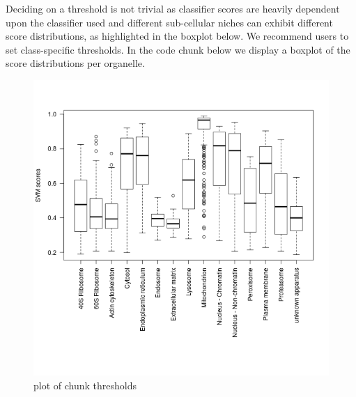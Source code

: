 Deciding on a threshold is not trivial as classifier scores are heavily
dependent upon the classifier used and different sub-cellular niches can
exhibit different score distributions, as highlighted in the boxplot
below. We recommend users to set class-specific thresholds. In the code
chunk below we display a boxplot of the score distributions per
organelle.

\begin{Shaded}
\begin{Highlighting}[]
\StringTok{ }

\NormalTok{(} \NormalTok{(}\NormalTok{, }\NormalTok{, }\NormalTok{, }\NormalTok{))}
\StringTok{ }  \NormalTok{, } \NormalTok{)}
\end{Highlighting}
\end{Shaded}

\begin{figure}[htbp]
\centering
\includegraphics{figure/thresholds-1.png}
\caption{plot of chunk thresholds}
\end{figure}

